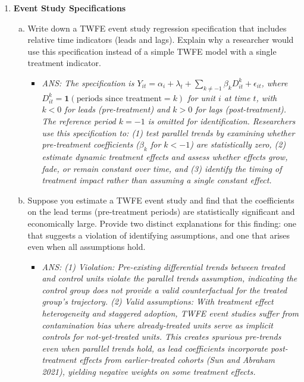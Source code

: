 \documentclass[12pt,a4paper]{article}
\newcommand{\ans}[1]{\begin{itemize}\item[$\bullet$] \textit{ANS: #1}\end{itemize}}
\begin{document}
\begin{enumerate}
\item \textbf{Event Study Specifications}
\begin{enumerate}[(a)]
\item Write down a TWFE event study regression specification that includes relative time indicators (leads and lags). Explain why a researcher would use this specification instead of a simple TWFE model with a single treatment indicator.
\ans{The specification is $Y_{it} = \alpha_i + \lambda_t + \sum_{k \neq -1}\beta_k D^{k}_{it} + \epsilon_{it}$, where $D^{k}_{it} = \mathbf{1}(\text{periods since treatment} = k)$ for unit $i$ at time $t$, with $k < 0$ for leads (pre-treatment) and $k > 0$ for lags (post-treatment). The reference period $k = -1$ is omitted for identification. Researchers use this specification to: (1) test parallel trends by examining whether pre-treatment coefficients ($\beta_k$ for $k < -1$) are statistically zero, (2) estimate dynamic treatment effects and assess whether effects grow, fade, or remain constant over time, and (3) identify the timing of treatment impact rather than assuming a single constant effect.}

\item Suppose you estimate a TWFE event study and find that the coefficients on the lead terms (pre-treatment periods) are statistically significant and economically large. Provide two distinct explanations for this finding: one that suggests a violation of identifying assumptions, and one that arises even when all assumptions hold.
\ans{(1) Violation: Pre-existing differential trends between treated and control units violate the parallel trends assumption, indicating the control group does not provide a valid counterfactual for the treated group's trajectory. (2) Valid assumptions: With treatment effect heterogeneity and staggered adoption, TWFE event studies suffer from contamination bias where already-treated units serve as implicit controls for not-yet-treated units. This creates spurious pre-trends even when parallel trends hold, as lead coefficients incorporate post-treatment effects from earlier-treated cohorts (Sun and Abraham 2021), yielding negative weights on some treatment effects.}


\end{enumerate}
\end{enumerate}
\end{document}
